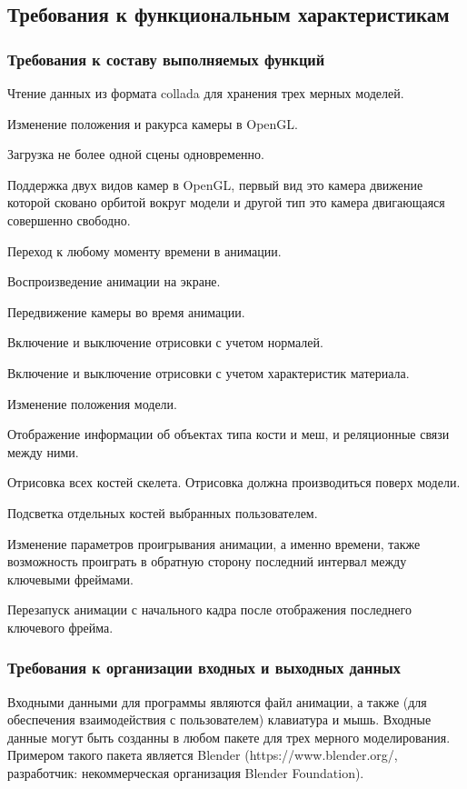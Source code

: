 

\subsection{Требования к функциональным характеристикам}
\subsubsection{Требования к составу выполняемых функций}
\begin{my_enumerate}
\item Чтение данных из формата collada для хранения трех мерных моделей.
\item Изменение положения и ракурса камеры в OpenGL.
\item Загрузка не более одной сцены одновременно.
\item Поддержка двух видов камер в OpenGL, первый вид это камера движение которой сковано орбитой вокруг модели и другой тип это камера двигающаяся совершенно свободно.
\item Переход к любому моменту времени в анимации.
\item Воспроизведение анимации на экране.
\item Передвижение камеры во время анимации.
\item Включение и выключение отрисовки с учетом нормалей.
\item Включение и выключение отрисовки с учетом характеристик материала.
\item Изменение положения модели.
\item Отображение информации об объектах типа кости и меш, и реляционные связи между ними. 
\item Отрисовка всех костей скелета. Отрисовка должна производиться поверх модели.
\item Подсветка отдельных костей выбранных пользователем.
\item Изменение параметров проигрывания анимации, а именно времени, также возможность проиграть в обратную сторону последний интервал между ключевыми фреймами.
\item Перезапуск анимации с начального кадра после отображения последнего ключевого фрейма.
\end{my_enumerate}

\subsubsection{Требования к организации входных и выходных данных}
Входными данными для программы являются файл анимации, а также (для обеспечения взаимодействия с пользователем) клавиатура и мышь. Входные данные могут быть созданны в любом пакете для трех мерного моделирования. Примером такого пакета является Blender (https://www.blender.org/, разработчик: некоммерческая организация Blender Foundation).

